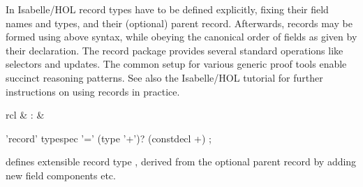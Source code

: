 \begin{isabellebody}
\begin{isamarkuptext}
  \medskip In Isabelle/HOL record types have to be defined explicitly,
  fixing their field names and types, and their (optional) parent
  record.  Afterwards, records may be formed using above syntax, while
  obeying the canonical order of fields as given by their declaration.
  The record package provides several standard operations like
  selectors and updates.  The common setup for various generic proof
  tools enable succinct reasoning patterns.  See also the Isabelle/HOL
  tutorial \cite{isabelle-hol-book} for further instructions on using
  records in practice.%
\end{isamarkuptext}%
\isamarkuptrue%
%
\isamarkuptrue%
%
\begin{isamarkuptext}%
\begin{matharray}{rcl}
    \hypertarget{command.HOL.record}{\hyperlink{command.HOL.record}{\mbox{}}} & : &  \\
  \end{matharray}

  \begin{rail}
    'record' typespec '=' (type '+')? (constdecl +)
    ;
  \end{rail}

  \begin{descr}

  \item [\hyperlink{command.HOL.record}{\mbox{\isa{\isacommand{record}}}}~\isa{{\isachardoublequote}{\isacharparenleft}{\isasymalpha}\isactrlsub {\isadigit{1}}{\isacharcomma}\ {\isasymdots}{\isacharcomma}\ {\isasymalpha}\isactrlsub m{\isacharparenright}\ t\ {\isacharequal}\ {\isasymtau}\ {\isacharplus}\ c\isactrlsub {\isadigit{1}}\ {\isacharcolon}{\isacharcolon}\ {\isasymsigma}\isactrlsub {\isadigit{1}}\ {\isasymdots}\ c\isactrlsub n\ {\isacharcolon}{\isacharcolon}\ {\isasymsigma}\isactrlsub n{\isachardoublequote}}] defines
  extensible record type ,
  derived from the optional parent record \isa{{\isachardoublequote}{\isasymtau}{\isachardoublequote}} by adding new
  field components  etc.


\end{descr}
\end{isamarkuptext}
\end{isabellebody}
